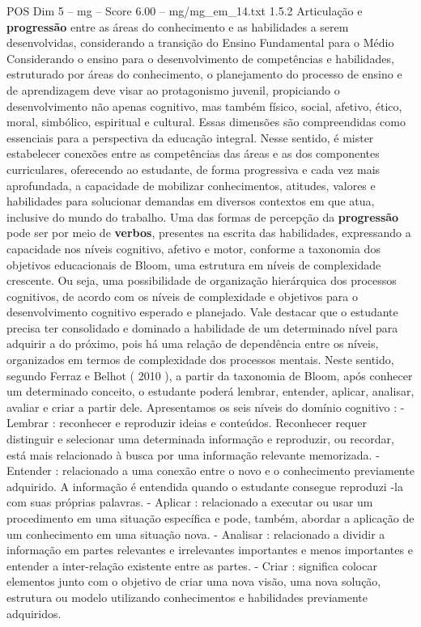 \begin{textsample}{POS Dim 5 – mg – Score 6.00 – mg/mg\_em\_14.txt}  \label{ex:f5_pos_190}
1.5.2 Articulação e \textbf{progressão} entre as áreas do conhecimento e as habilidades a serem desenvolvidas, considerando a transição do Ensino Fundamental para o Médio Considerando o ensino para o desenvolvimento de competências e habilidades, estruturado por áreas do conhecimento, o planejamento do processo de ensino e de aprendizagem deve visar ao protagonismo juvenil, propiciando o desenvolvimento não apenas cognitivo, mas também físico, social, afetivo, ético, moral, simbólico, espiritual e cultural.
Essas dimensões são compreendidas como essenciais para a perspectiva da educação integral.
Nesse sentido, é mister estabelecer conexões entre as competências das áreas e as dos componentes curriculares, oferecendo ao estudante, de forma progressiva e cada vez mais aprofundada, a capacidade de mobilizar conhecimentos, atitudes, valores e habilidades para solucionar demandas em diversos contextos em que atua, inclusive do mundo do trabalho.
Uma das formas de percepção da \textbf{progressão} pode ser por meio de \textbf{verbos}, presentes na escrita das habilidades, expressando a capacidade nos níveis cognitivo, afetivo e motor, conforme a taxonomia dos objetivos educacionais de Bloom, uma estrutura em níveis de complexidade crescente.
Ou seja, uma possibilidade de organização hierárquica dos processos cognitivos, de acordo com os níveis de complexidade e objetivos para o desenvolvimento cognitivo esperado e planejado.
Vale destacar que o estudante precisa ter consolidado e dominado a habilidade de um determinado nível para adquirir a do próximo, pois há uma relação de dependência entre os níveis, organizados em termos de complexidade dos processos mentais.
Neste sentido, segundo Ferraz e Belhot ( 2010 ), a partir da taxonomia de Bloom, após conhecer um determinado conceito, o estudante poderá lembrar, entender, aplicar, analisar, avaliar e criar a partir dele.
Apresentamos os seis níveis do domínio cognitivo : - Lembrar : reconhecer e reproduzir ideias e conteúdos.
Reconhecer requer distinguir e selecionar uma determinada informação e reproduzir, ou recordar, está mais relacionado à busca por uma informação relevante memorizada. - Entender : relacionado a uma conexão entre o novo e o conhecimento previamente adquirido.
A informação é entendida quando o estudante consegue reproduzi -la com suas próprias palavras. - Aplicar : relacionado a executar ou usar um procedimento em uma situação específica e pode, também, abordar a aplicação de um conhecimento em uma situação nova. - Analisar : relacionado a dividir a informação em partes relevantes e irrelevantes importantes e menos importantes e entender a inter-relação existente entre as partes. - Criar : significa colocar elementos junto com o objetivo de criar uma nova visão, uma nova solução, estrutura ou modelo utilizando conhecimentos e habilidades previamente adquiridos.

\end{textsample}
